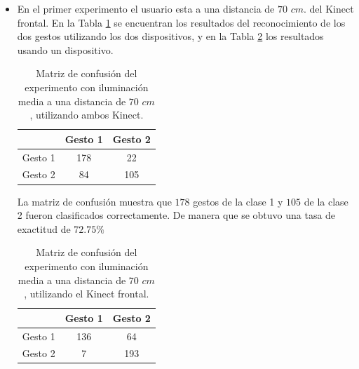 
\begin{itemize}

\item En el primer experimento el usuario esta a una distancia de $70$ $cm.$ del Kinect frontal. En la Tabla \ref{table:70LMK2} se encuentran los resultados del reconocimiento de los dos gestos utilizando los dos dispositivos, y en la Tabla \ref{table:70LMK1} los resultados usando un dispositivo.  


\begin{table}[h!] 
\begin{center}
\begin{tabular}{ r || c | c |}  
        & Gesto 1 & Gesto 2 \\ \hline \hline  
Gesto 1 & 178    &  22     \\ \hline  
Gesto 2 & 84     & 105     \\   
\end{tabular}
\end{center} 
\caption{Matriz de confusión del experimento con iluminación media a una distancia de $70$ $cm$, utilizando ambos Kinect.}
\label{table:70LMK2}
\end{table}

La matriz de confusión muestra que $178$ gestos de la clase 1 y $105$ de la clase 2 fueron clasificados correctamente. De manera que se obtuvo una tasa de exactitud de $72.75 \%$ 

\begin{table}[h!] 
\begin{center}
\begin{tabular}{ r || c | c |} 
        & Gesto 1 & Gesto 2 \\ \hline \hline  
Gesto 1 & 136    &  64     \\ \hline  
Gesto 2 & 7     &  193     \\   
\end{tabular}
\end{center} 
\caption{Matriz de confusión del experimento con iluminación media a una distancia de $70$ $cm$, utilizando el Kinect frontal.} 
\label{table:70LMK1}
\end{table} 


\end{itemize}
